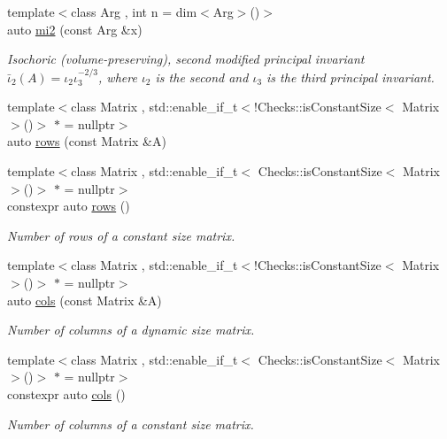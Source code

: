 \begin{DoxyCompactItemize}
{\footnotesize template$<$class Arg , int n = dim$<$\-Arg$>$()$>$ }\\auto \hyperlink{group__InvariantGroup_ga9d219c5c48cce1d3af60345916963524}{mi2} (const \-Arg \&x)
\begin{DoxyCompactList}\small\item\em \-Isochoric (volume-\/preserving), second modified principal invariant $ \bar\iota_2(A)=\iota_2\iota_3^{-2/3} $, where $\iota_2$ is the second and $\iota_3$ is the third principal invariant. \end{DoxyCompactList}\item 
{\footnotesize template$<$class Matrix , std\-::enable\-\_\-if\-\_\-t$<$!\-Checks\-::is\-Constant\-Size$<$ Matrix $>$()$>$ $\ast$  = nullptr$>$ }\\auto \hyperlink{namespaceFunG_1_1LinearAlgebra_abd3afa2fcd2194787342b2662cfa9f5a}{rows} (const \-Matrix \&\-A)
\item 
{\footnotesize template$<$class Matrix , std\-::enable\-\_\-if\-\_\-t$<$ Checks\-::is\-Constant\-Size$<$ Matrix $>$()$>$ $\ast$  = nullptr$>$ }\\constexpr auto \hyperlink{namespaceFunG_1_1LinearAlgebra_ab401cccb1259e724bf37d2e198e2ca3d}{rows} ()
\begin{DoxyCompactList}\small\item\em \-Number of rows of a constant size matrix. \end{DoxyCompactList}\item 
{\footnotesize template$<$class Matrix , std\-::enable\-\_\-if\-\_\-t$<$!\-Checks\-::is\-Constant\-Size$<$ Matrix $>$()$>$ $\ast$  = nullptr$>$ }\\auto \hyperlink{namespaceFunG_1_1LinearAlgebra_ae981b8bee32eea3ce87f41874835c9c1}{cols} (const \-Matrix \&\-A)
\begin{DoxyCompactList}\small\item\em \-Number of columns of a dynamic size matrix. \end{DoxyCompactList}\item 
{\footnotesize template$<$class Matrix , std\-::enable\-\_\-if\-\_\-t$<$ Checks\-::is\-Constant\-Size$<$ Matrix $>$()$>$ $\ast$  = nullptr$>$ }\\constexpr auto \hyperlink{namespaceFunG_1_1LinearAlgebra_a9eb685419fe4c5f91619d5aa0f973320}{cols} ()
\begin{DoxyCompactList}\small\item\em \-Number of columns of a constant size matrix. \end{DoxyCompactList}\item 

\end{DoxyCompactItemize}
